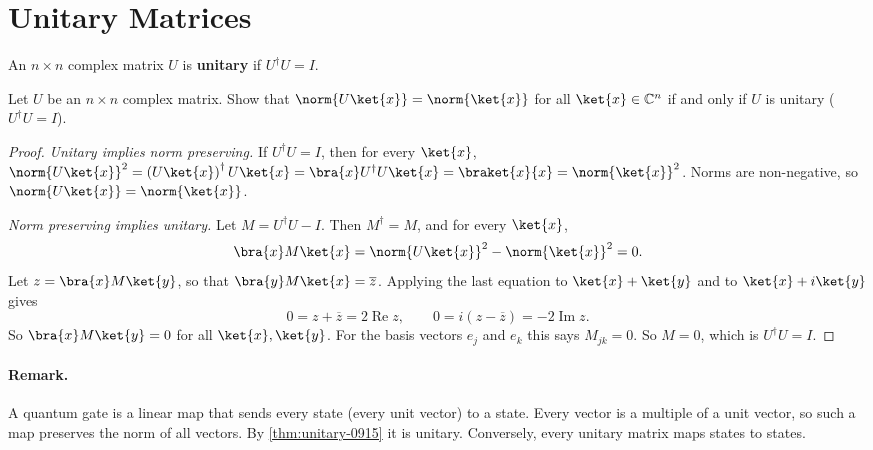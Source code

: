 \section{Unitary Matrices}

\begin{definition}\label{def:unitary-0915}
    An $n \times n$ complex matrix $U$ is \textbf{unitary} if $U^\dagger U = I$.
\end{definition}

\begin{exercisebox}
\begin{exercise}\label{ex:unitary-0915}\label{thm:unitary-0915}
    Let $U$ be an $n \times n$ complex matrix. Show that $\norm{U \ket{x}} = \norm{\ket{x}}$ for all
    $\ket{x} \in \mathbb{C}^n$ if and only if $U$ is unitary ($U^\dagger U = I$).
\end{exercise}
\tcblower
\begin{proof}
    \emph{Unitary implies norm preserving.} If $U^\dagger U = I$, then for every $\ket{x}$,
    $\norm{U \ket{x}}^2 = \left(U \ket{x}\right)^\dagger U \ket{x} = \bra{x} U^\dagger U \ket{x}
        = \braket{x}{x} = \norm{\ket{x}}^2$.
    Norms are non-negative, so $\norm{U \ket{x}} = \norm{\ket{x}}$.

    \emph{Norm preserving implies unitary.} Let $M = U^\dagger U - I$. Then $M^\dagger = M$, and for
    every $\ket{x}$,
    \[\bra{x} M \ket{x} = \norm{U \ket{x}}^2 - \norm{\ket{x}}^2 = 0.\]
    Let $z = \bra{x} M \ket{y}$, so that $\bra{y} M \ket{x} = \overline{z}$. Applying the last
    equation to $\ket{x} + \ket{y}$ and to $\ket{x} + i \ket{y}$ gives
    \[0 = z + \overline{z} = 2 \operatorname{Re} z,
        \qquad
        0 = i \left(z - \overline{z}\right) = -2 \operatorname{Im} z.\]
    So $\bra{x} M \ket{y} = 0$ for all $\ket{x}, \ket{y}$. For the basis vectors $e_j$ and $e_k$ this
    says $M_{jk} = 0$. So $M = 0$, which is $U^\dagger U = I$.
\end{proof}
\end{exercisebox}

\paragraph{Remark.} A quantum gate is a linear map that sends every state (every unit vector) to a
state. Every vector is a multiple of a unit vector, so such a map preserves the norm of all vectors.
By \cref{thm:unitary-0915} it is unitary. Conversely, every unitary matrix maps states to states.

